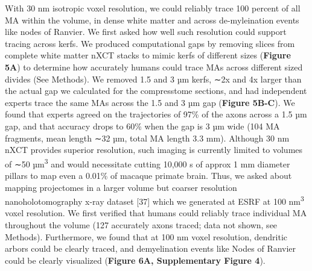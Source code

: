 \documentclass{article}
\begin{document}
With 30 nm isotropic voxel resolution, we could reliably trace 100 percent of all MA within the volume, in dense white matter and across de-myleination events like nodes of Ranvier. We first asked how well such resolution could support tracing across kerfs. We produced computational gaps by removing slices from complete white matter nXCT stacks to mimic kerfs of different sizes (\textbf{Figure 5A}) to determine how accurately humans could trace MAs across different sized divides (See Methods). We removed 1.5 and 3 µm kerfs, ∼2x and 4x larger than the actual gap we calculated for the compresstome sections, and had independent experts trace the same MAs across the 1.5 and 3 µm gap (\textbf{Figure 5B-C}). We found that experts agreed on the trajectories of 97\% of the axons across a 1.5 µm gap, and that accuracy drops to 60\% when the gap is 3 µm wide (104 MA fragments, mean length ∼32 µm, total MA length 3.3 mm). Although 30 nm nXCT provides superior resolution, such imaging is currently limited to volumes of ∼50 µm\textsuperscript{3} and would necessitate cutting 10,000 s of approx 1 mm diameter pillars to map even a 0.01\% of macaque primate brain. Thus, we asked about mapping projectomes in a larger volume but coarser resolution nanoholotomography x-ray dataset [37] which we generated at ESRF at 100 nm\textsuperscript{3} voxel resolution. We first verified that humans could reliably trace individual MA throughout the volume (127 accurately axons traced; data not shown, see Methods). Furthermore, we found that at 100 nm voxel resolution, dendritic arbors could be clearly traced, and demyelination events like Nodes of Ranvier could be clearly visualized (\textbf{Figure 6A, Supplementary Figure 4}).
\end{document}
